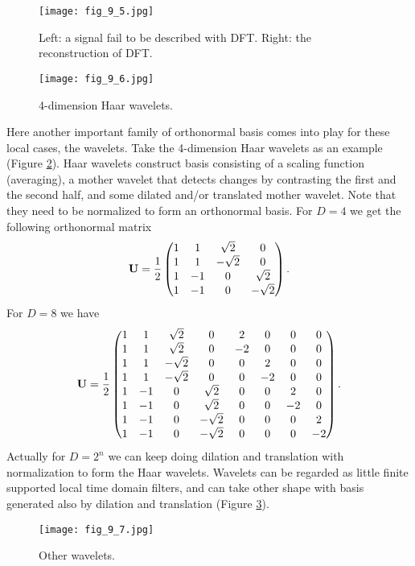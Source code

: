 \documentclass[../main.tex]{subfiles}
\begin{document}
\begin{figure}[h] 
	\centering 
	\texttt{[image: fig\_9\_5.jpg]} 
	\caption{Left: a signal fail to be described with DFT. Right: the reconstruction of DFT.}\label{fig_9_5}
\end{figure}
\begin{figure}[h] 
	\centering 
	\texttt{[image: fig\_9\_6.jpg]} 
	\caption{4-dimension Haar wavelets.}\label{fig_9_6}
\end{figure}
\par Here another important family of orthonormal basis comes into play for these local cases, the wavelets. Take the 4-dimension Haar wavelets as an example (Figure \ref{fig_9_6}). Haar wavelets construct basis consisting of a scaling function (averaging), a mother wavelet that detects changes by contrasting the first and the second half, and some dilated and/or translated mother wavelet. Note that they need to be normalized to form an orthonormal basis. For $D=4$ we get the following orthonormal matrix
\begin{equation*}
{\bf U}=\frac{1}{2}\begin{pmatrix}
1&1&\sqrt{2}&0\\
1&1&-\sqrt{2}&0\\
1&-1&0&\sqrt{2}\\
1&-1&0&-\sqrt{2}
\end{pmatrix}.
\end{equation*}
For $D=8$ we have
\begin{equation*}
{\bf U}=\frac{1}{2}\begin{pmatrix}
1&1&\sqrt{2}&0&2&0&0&0\\
1&1&\sqrt{2}&0&-2&0&0&0\\
1&1&-\sqrt{2}&0&0&2&0&0\\
1&1&-\sqrt{2}&0&0&-2&0&0\\
1&-1&0&\sqrt{2}&0&0&2&0\\
1&-1&0&\sqrt{2}&0&0&-2&0\\
1&-1&0&-\sqrt{2}&0&0&0&2\\
1&-1&0&-\sqrt{2}&0&0&0&-2
\end{pmatrix}.
\end{equation*}
Actually for $D=2^n$ we can keep doing dilation and translation with normalization to form the Haar wavelets. Wavelets can be regarded as little finite supported local time domain filters, and can take other shape with basis generated also by dilation and translation (Figure \ref{fig_9_7}).
\begin{figure}[h] 
	\centering 
	\texttt{[image: fig\_9\_7.jpg]} 
	\caption{Other wavelets.}\label{fig_9_7}
\end{figure}
\end{document}
